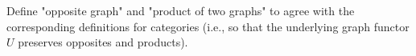 Define "opposite graph" and "product of two graphs" to agree with the corresponding definitions for categories (i.e., so that the underlying graph functor $U$ preserves opposites and products).